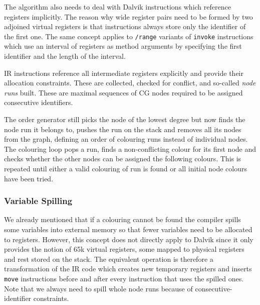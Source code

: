\documentclass[12pt,twoside,notitlepage]{report}
\begin{document}
The algorithm also needs to deal with Dalvik instructions which reference registers implicitly. The reason why wide register pairs need to be formed by two adjoined virtual registers is that instructions always store only the identifier of the first one. The same concept applies to \verb$/range$ variants of \verb$invoke$ instructions which use an interval of registers as method arguments by specifying the first identifier and the length of the interval.

IR instructions reference all intermediate registers explicitly and provide their allocation constraints. These are collected, checked for conflict, and so-called \emph{node runs} built. These are maximal sequences of CG nodes required to be assigned consecutive identifiers. 

The order generator still picks the node of the lowest degree but now finds the node run it belongs to, pushes the run on the stack and removes all its nodes from the graph, defining an order of colouring runs instead of individual nodes. The colouring loop pops a run, finds a non-conflicting colour for its first node and checks whether the other nodes can be assigned the following colours. This is repeated until either a valid colouring of run is found or all initial node colours have been tried.

\subsubsection{Variable Spilling}

We already mentioned that if a colouring cannot be found the compiler spills some variables into external memory so that fewer variables need to be allocated to registers. However, this concept does not directly apply to Dalvik since it only provides the notion of 65k virtual registers, some mapped to physical registers and rest stored on the stack. The equivalent operation is therefore a transformation of the IR code which creates new temporary registers and inserts \verb$move$ instructions before and after every instruction that uses the spilled ones. Note that we always need to spill whole node runs because of consecutive-identifier constraints.
\end{document}
